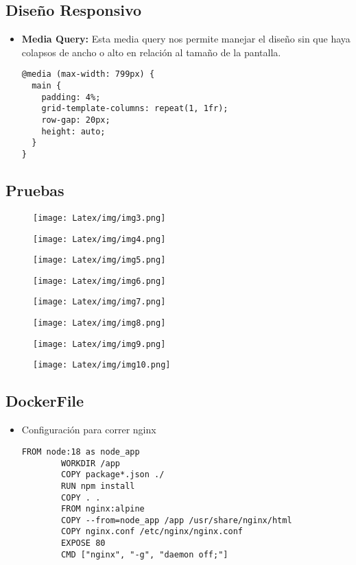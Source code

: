 \documentclass{article}
\begin{document}
\subsection{Diseño Responsivo}
\begin{itemize}
\item{\textbf{Media Query:}
Esta media query nos permite manejar el diseño sin que haya colapsos de ancho o alto en relación al tamaño de la pantalla.}
\begin{lstlisting}[style=ascii-tree]
@media (max-width: 799px) {
  main {
    padding: 4%;
    grid-template-columns: repeat(1, 1fr);
    row-gap: 20px;
    height: auto;
  }
}
\end{lstlisting}
\end{itemize}
\subsection{Pruebas}
\begin{figure}[H]
    \centering
    \texttt{[image: Latex/img/img3.png]}
\end{figure}
\begin{figure}[H]
    \centering
    \texttt{[image: Latex/img/img4.png]}
\end{figure}
\begin{figure}[H]
    \centering
    \texttt{[image: Latex/img/img5.png]}
\end{figure}
\begin{figure}[H]
    \centering
    \texttt{[image: Latex/img/img6.png]}
\end{figure}
\begin{figure}[H]
    \centering
    \texttt{[image: Latex/img/img7.png]}
\end{figure}
\begin{figure}[H]
    \centering
    \texttt{[image: Latex/img/img8.png]}
\end{figure}
\begin{figure}[H]
    \centering
    \texttt{[image: Latex/img/img9.png]}
\end{figure}
\begin{figure}[H]
    \centering
    \texttt{[image: Latex/img/img10.png]}
\end{figure}
\subsection{DockerFile}
\begin{itemize}
        \item Configuración para correr nginx
        \begin{lstlisting}[style=ascii-tree]
        FROM node:18 as node_app
        WORKDIR /app
        COPY package*.json ./
        RUN npm install
        COPY . .
        FROM nginx:alpine
        COPY --from=node_app /app /usr/share/nginx/html
        COPY nginx.conf /etc/nginx/nginx.conf
        EXPOSE 80
        CMD ["nginx", "-g", "daemon off;"]
\end{lstlisting}
	
\end{itemize}
\end{document}
